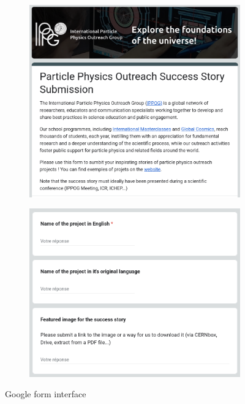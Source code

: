 \begin{figure}[h!]
    \centering
    \begin{subfigure}[c]{.6\textwidth}
        \centering
        \includegraphics[width=\linewidth]{Image/Process/gform.png}
    \end{subfigure}
    \bigskip
    \begin{subfigure}[c]{.6\textwidth}
        \centering
        \includegraphics[width=\linewidth]{Image/Process/gform2.png}
    \end{subfigure}
    \caption{Google form interface}
    \label{fig:gform}
\end{figure}


